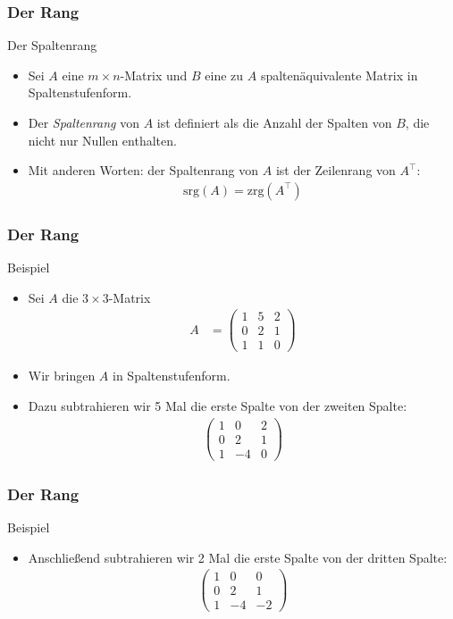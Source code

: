 \documentclass{beamer}
\renewcommand{\emph}[1]{{\textcolor{solarizedRed}{\itshape #1}}}
\newcommand{\trans}{\top}
\renewcommand{\ae}{\"a}
\newcommand{\rrk}{\mathrm{zrg}}
\newcommand{\crk}{\mathrm{srg}}
\newcommand{\mytitle}{Der Rang}
\begin{document}
\begin{frame}\frametitle{\mytitle}
	\begin{block}{Der Spaltenrang}
	\begin{itemize}
		\item Sei $A$ eine $m\times n$-Matrix und $B$ eine zu $A$ spalten\ae quivalente Matrix in Spaltenstufenform.
		\item Der \emph{Spaltenrang} von $A$ ist definiert als die Anzahl der Spalten von $B$, die nicht nur Nullen enthalten.
		\item Mit anderen Worten: der Spaltenrang von $A$ ist der Zeilenrang von $A^\trans$:
			\begin{align*}
				\crk(A)=\rrk(A^\trans)
			\end{align*}
	\end{itemize}
	\end{block}
\end{frame}

\begin{frame}\frametitle{\mytitle}
	\begin{block}{Beispiel}
	\begin{itemize}
		\item Sei $A$ die $3\times 3$-Matrix 
			\begin{align*}
				A&=\begin{pmatrix} 1&5&2\\0&2&1\\1&1&0 \end{pmatrix}
			\end{align*}
		\item Wir bringen $A$ in Spaltenstufenform.
		\item Dazu subtrahieren wir 5 Mal die erste Spalte von der zweiten Spalte:
			\begin{align*}
				\begin{pmatrix} 1&0&2\\0&2&1\\1&-4&0 \end{pmatrix}
			\end{align*}
	\end{itemize}
	\end{block}
\end{frame}

\begin{frame}\frametitle{\mytitle}
	\begin{block}{Beispiel}
	\begin{itemize}
		\item Anschlie\ss end subtrahieren wir 2 Mal die erste Spalte von der dritten Spalte:
			\begin{align*}
				\begin{pmatrix} 1&0&0\\0&2&1\\1&-4&-2 \end{pmatrix}
			\end{align*}
	\end{itemize}
	\end{block}
\end{frame}
\end{document}
